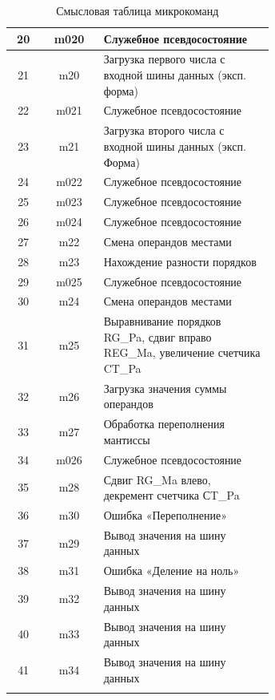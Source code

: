 \documentclass[a4paper,14pt]{extarticle}
\begin{document}
\begin{longtable}{|c||c|m{0.65\linewidth}|}
	20 & m020 & Служебное псевдосостояние \\ \hline
	21 & m20 & Загрузка первого числа с входной шины данных (эксп. форма) \\ \hline
	22 & m021 & Служебное псевдосостояние \\ \hline
	23 & m21 & Загрузка второго числа с входной шины данных (эксп. Форма) \\ \hline
	24 & m022 & Служебное псевдосостояние \\ \hline
	25 & m023 & Служебное псевдосостояние \\ \hline
	26 & m024 & Служебное псевдосостояние \\ \hline
	27 & m22 & Смена операндов местами \\ \hline
	28 & m23 & Нахождение разности порядков \\ \hline
	29 & m025 & Служебное псевдосостояние \\ \hline
	30 & m24 & Смена операндов местами \\ \hline
	31 & m25 & Выравнивание порядков RG\_Pa, сдвиг вправо REG\_Ma, увеличение счетчика CT\_Pa \\ \hline
	32 & m26 & Загрузка значения суммы операндов \\ \hline
	33 & m27 & Обработка переполнения мантиссы \\ \hline
	34 & m026 & Служебное псевдосостояние \\ \hline
	35 & m28 & Сдвиг RG\_Ma влево, декремент счетчика СT\_Pa \\ \hline
	36 & m30 & Ошибка «Переполнение» \\ \hline
	37 & m29 & Вывод значения на шину данных \\ \hline
	38 & m31 & Ошибка «Деление на ноль» \\ \hline
	39 & m32 & Вывод значения на шину данных \\ \hline
	40 & m33 & Вывод значения на шину данных \\ \hline
	41 & m34 & Вывод значения на шину данных \\ \hline
	\caption{Смысловая таблица микрокоманд}
	\label{tab:coursecommands}
\end{longtable}

\normalsize
\end{document}
